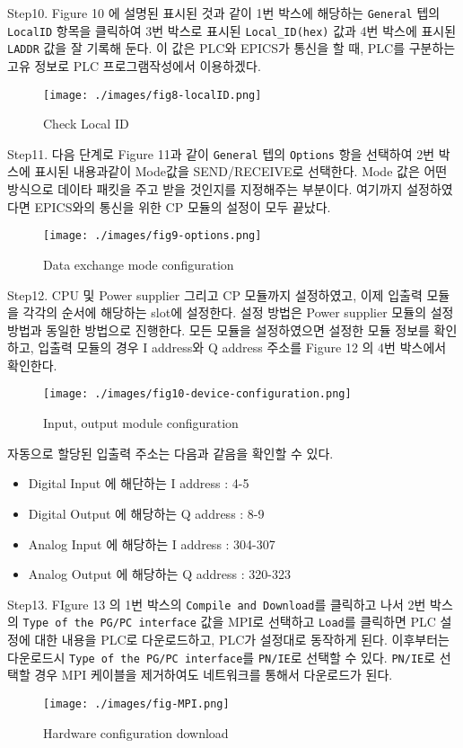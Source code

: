 \documentclass[11pt
  , a4paper
  , article
  , oneside
]{memoir}
\begin{document}
\newline Step10. Figure 10 에 설명된 표시된 것과 같이 1번 박스에 해당하는 \verb|General| 텝의 \verb|LocalID| 항목을 클릭하여 3번 박스로 표시된 \verb|Local_ID(hex)| 값과 4번 박스에 표시된 \verb|LADDR| 값을 잘 기록해 둔다. 이 값은 PLC와 EPICS가 통신을 할 때, PLC를 구분하는 고유 정보로 PLC 프로그램작성에서 이용하겠다.\\
\begin{figure}[!htb]
  \centering
  \texttt{[image: ./images/fig8-localID.png]}
  \caption{Check Local ID}
  \label{}
\end{figure}
\newline Step11. 다음 단계로 Figure 11과 같이 \verb|General| 텝의 \verb|Options| 항을 선택하여 2번 박스에 표시된 내용과같이 Mode값을 SEND/RECEIVE로 선택한다. Mode 값은 어떤 방식으로 데이타 패킷을 주고 받을 것인지를 지정해주는 부분이다. 여기까지 설정하였다면 EPICS와의 통신을 위한 CP 모듈의 설정이 모두 끝났다.
\begin{figure}[!htb]
  \centering
  \texttt{[image: ./images/fig9-options.png]}
  \caption{Data exchange mode configuration}
  \label{}
\end{figure}
\newline Step12. CPU 및 Power supplier 그리고 CP 모듈까지 설정하였고, 이제 입출력 모듈을 각각의 순서에 해당하는 slot에 설정한다. 설정 방법은 Power supplier 모듈의 설정 방법과 동일한 방법으로 진행한다. 모든 모듈을 설정하였으면 설정한 모듈 정보를 확인하고, 입출력 모듈의 경우 I address와 Q address 주소를 Figure 12 의 4번 박스에서 확인한다. 
\begin{figure}[!htb]
  \centering
  \texttt{[image: ./images/fig10-device-configuration.png]}
  \caption{Input, output module configuration}
  \label{}
\end{figure}
\newline 자동으로 할당된 입출력 주소는 다음과 같음을 확인할 수 있다.
\begin{itemize}
\item Digital Input 에 해단하는 I address : 4-5 
\item Digital Output 에 해당하는 Q address : 8-9
\item Analog Input 에 해당하는 I address : 304-307
\item Analog Output 에 해당하는 Q address : 320-323 
\end{itemize}
Step13. FIgure 13 의 1번 박스의 \verb|Compile and Download|를 클릭하고 나서 2번 박스의 \verb|Type of the PG/PC interface| 값을 MPI로 선택하고 \verb|Load|를 클릭하면 PLC 설정에 대한 내용을 PLC로 다운로드하고, PLC가 설정대로 동작하게 된다. 이후부터는 다운로드시 \verb|Type of the PG/PC interface|를 \verb|PN/IE|로 선택할 수 있다. \verb|PN/IE|로 선택할 경우 MPI 케이블을 제거하여도 네트워크를 통해서 다운로드가 된다. 
\begin{figure}[!htb]
  \centering
  \texttt{[image: ./images/fig-MPI.png]}
  \caption{Hardware configuration download}
  \label{}
\end{figure}
\end{document}

